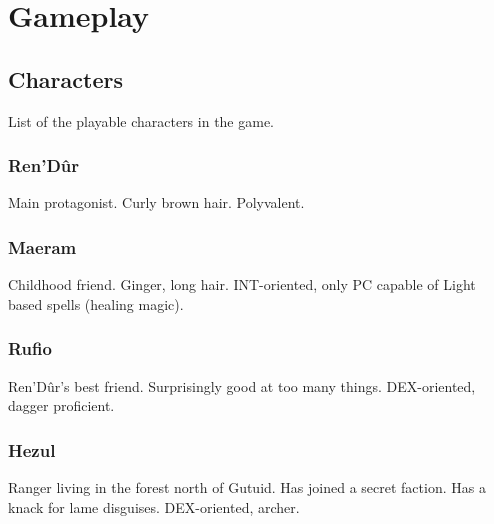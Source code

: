 \documentclass[a4paper,12pt]{book}
\begin{document}
\part{Gameplay}
\chapter{Characters}
List of the playable characters in the game.
\section{Ren'D\^{u}r}
Main protagonist. Curly brown hair. Polyvalent.
\section{Maeram}
Childhood friend. Ginger, long hair. INT-oriented, only PC capable of Light based spells (healing magic).
\section{Rufio}
Ren'D\^{u}r's best friend. Surprisingly good at too many things. DEX-oriented, dagger proficient.
\section{Hezul}
Ranger living in the forest north of Gutuid. Has joined a secret faction. Has a knack for lame disguises. DEX-oriented, archer.
\end{document}
